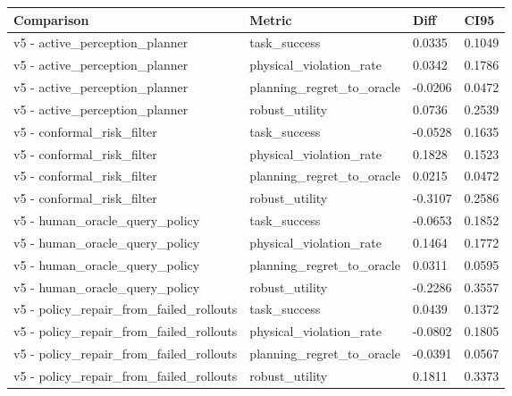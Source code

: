 \begin{tabular}{llll}
\toprule
Comparison & Metric & Diff & CI95 \\
\midrule
v5 - active\_perception\_planner & task\_success & 0.0335 & 0.1049 \\
v5 - active\_perception\_planner & physical\_violation\_rate & 0.0342 & 0.1786 \\
v5 - active\_perception\_planner & planning\_regret\_to\_oracle & -0.0206 & 0.0472 \\
v5 - active\_perception\_planner & robust\_utility & 0.0736 & 0.2539 \\
v5 - conformal\_risk\_filter & task\_success & -0.0528 & 0.1635 \\
v5 - conformal\_risk\_filter & physical\_violation\_rate & 0.1828 & 0.1523 \\
v5 - conformal\_risk\_filter & planning\_regret\_to\_oracle & 0.0215 & 0.0472 \\
v5 - conformal\_risk\_filter & robust\_utility & -0.3107 & 0.2586 \\
v5 - human\_oracle\_query\_policy & task\_success & -0.0653 & 0.1852 \\
v5 - human\_oracle\_query\_policy & physical\_violation\_rate & 0.1464 & 0.1772 \\
v5 - human\_oracle\_query\_policy & planning\_regret\_to\_oracle & 0.0311 & 0.0595 \\
v5 - human\_oracle\_query\_policy & robust\_utility & -0.2286 & 0.3557 \\
v5 - policy\_repair\_from\_failed\_rollouts & task\_success & 0.0439 & 0.1372 \\
v5 - policy\_repair\_from\_failed\_rollouts & physical\_violation\_rate & -0.0802 & 0.1805 \\
v5 - policy\_repair\_from\_failed\_rollouts & planning\_regret\_to\_oracle & -0.0391 & 0.0567 \\
v5 - policy\_repair\_from\_failed\_rollouts & robust\_utility & 0.1811 & 0.3373 \\
\bottomrule
\end{tabular}
